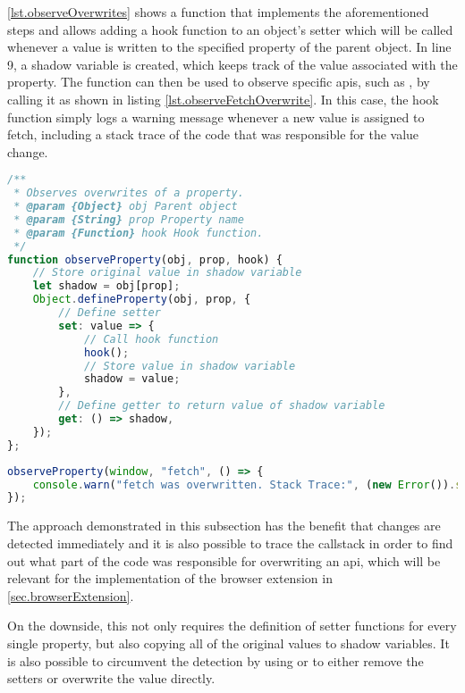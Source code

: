 \autoref{lst.observeOverwrites} shows a function that implements the aforementioned steps and allows adding a hook function to an object's setter which will be called whenever a value is written to the specified property of the parent object. In line 9, a shadow variable is created, which keeps track of the value associated with the property. The function can then be used to observe specific \acp{api}, such as , by calling it as shown in listing \ref{lst.observeFetchOverwrite}. In this case, the hook function simply logs a warning message whenever a new value is assigned to fetch, including a stack trace of the code that was responsible for the value change.

\filbreak{}

\begin{lstlisting}[language=JavaScript,label={lst.observeOverwrites},caption={Function that can be used to observe overwrites of an object's property}]
/**
 * Observes overwrites of a property.
 * @param {Object} obj Parent object
 * @param {String} prop Property name
 * @param {Function} hook Hook function.
 */
function observeProperty(obj, prop, hook) {
    // Store original value in shadow variable
    let shadow = obj[prop];
    Object.defineProperty(obj, prop, {
        // Define setter
        set: value => {
            // Call hook function
            hook();
            // Store value in shadow variable
            shadow = value;
        },
        // Define getter to return value of shadow variable
        get: () => shadow,
    });
};
\end{lstlisting}

\begin{lstlisting}[language=JavaScript,label={lst.observeFetchOverwrite},caption={Observing changes to the fetch API}]
observeProperty(window, "fetch", () => {
    console.warn("fetch was overwritten. Stack Trace:", (new Error()).stack);
});
\end{lstlisting}

The approach demonstrated in this subsection has the benefit that changes are detected immediately and it is also possible to trace the callstack in order to find out what part of the code was responsible for overwriting an \ac{api}, which will be relevant for the implementation of the browser extension in \autoref{sec.browserExtension}.

On the downside, this not only requires the definition of setter functions for every single property, but also copying all of the original values to shadow variables. It is also possible to circumvent the detection by using  or  to either remove the setters or overwrite the value directly.

